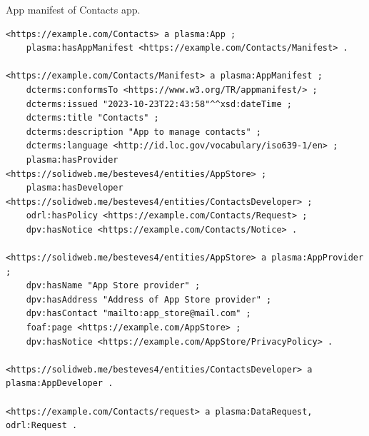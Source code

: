 \begin{listing}[htp]
\caption{App manifest of Contacts app.}
\label{list:plasma_appmanifest}
\begin{verbatim}
<https://example.com/Contacts> a plasma:App ;
    plasma:hasAppManifest <https://example.com/Contacts/Manifest> .

<https://example.com/Contacts/Manifest> a plasma:AppManifest ;
    dcterms:conformsTo <https://www.w3.org/TR/appmanifest/> ;
    dcterms:issued "2023-10-23T22:43:58"^^xsd:dateTime ;
    dcterms:title "Contacts" ;
    dcterms:description "App to manage contacts" ;
    dcterms:language <http://id.loc.gov/vocabulary/iso639-1/en> ;
    plasma:hasProvider <https://solidweb.me/besteves4/entities/AppStore> ;
    plasma:hasDeveloper <https://solidweb.me/besteves4/entities/ContactsDeveloper> ;
    odrl:hasPolicy <https://example.com/Contacts/Request> ;
    dpv:hasNotice <https://example.com/Contacts/Notice> .

<https://solidweb.me/besteves4/entities/AppStore> a plasma:AppProvider ;
    dpv:hasName "App Store provider" ;
    dpv:hasAddress "Address of App Store provider" ;
    dpv:hasContact "mailto:app_store@mail.com" ;
    foaf:page <https://example.com/AppStore> ;
    dpv:hasNotice <https://example.com/AppStore/PrivacyPolicy> .

<https://solidweb.me/besteves4/entities/ContactsDeveloper> a plasma:AppDeveloper .

<https://example.com/Contacts/request> a plasma:DataRequest, odrl:Request .
\end{verbatim}
\end{listing}

